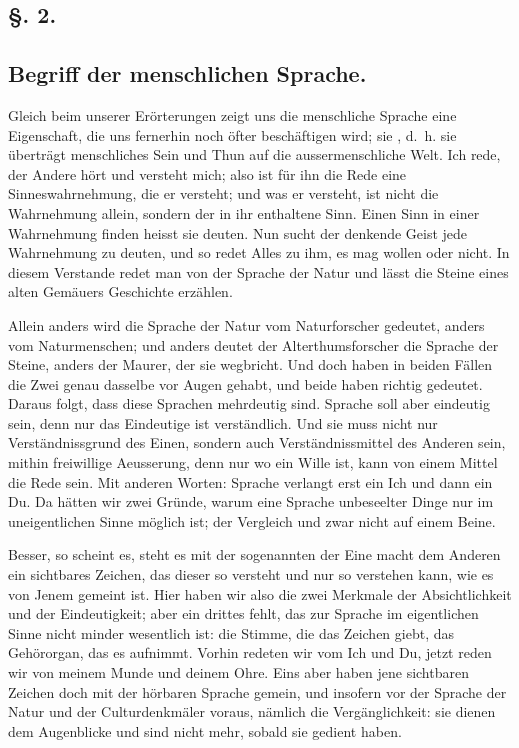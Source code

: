 \label{sp.2}

\subsection*{§. 2.}\label{I.I.2}
\subsection*{Begriff der menschlichen Sprache.}

Gleich beim  unserer Erörterungen zeigt uns die menschliche Sprache eine Eigenschaft, die uns fernerhin noch öfter beschäftigen wird; sie , d.~h. sie überträgt menschliches Sein und Thun auf die aussermenschliche Welt. Ich rede, der Andere hört und versteht mich; also ist für ihn die Rede eine Sinneswahrnehmung, die er versteht; und was er versteht, ist nicht die Wahrnehmung allein, sondern der in ihr enthaltene Sinn. Einen Sinn in einer Wahrnehmung finden heisst sie deuten. Nun sucht der denkende Geist jede Wahrnehmung zu deuten, und so redet Alles zu ihm, es mag wollen oder nicht. In diesem Verstande redet man von der Sprache der Natur und lässt die Steine eines alten Gemäuers Geschichte erzählen.

Allein anders wird die Sprache der Natur vom Naturforscher gedeutet, anders vom Naturmenschen; und anders deutet der Alterthumsforscher die Sprache der Steine, anders der Maurer, der sie wegbricht. Und doch haben in beiden Fällen die Zwei genau dasselbe vor Augen gehabt, und beide haben richtig gedeutet. Daraus folgt, dass diese Sprachen mehrdeutig sind. Sprache soll aber eindeutig sein, denn nur das Eindeutige ist verständlich. Und sie muss nicht nur Verständnissgrund des Einen, sondern auch Verständnissmittel des Anderen sein, mithin freiwillige Aeusserung, denn nur wo ein Wille ist, kann von einem Mittel die Rede sein. Mit anderen Worten: Sprache verlangt erst ein Ich und dann ein Du. Da hätten wir zwei Gründe, warum eine Sprache unbeseelter Dinge nur im uneigentlichen Sinne möglich ist; der Vergleich  und zwar nicht  auf einem Beine.

Besser, so scheint es, steht es mit der sogenannten  der Eine macht dem Anderen ein sichtbares Zeichen, das dieser so versteht und nur so verstehen kann, wie es von Jenem gemeint ist. Hier haben wir also die zwei Merkmale der Absichtlichkeit und der Eindeutigkeit; aber ein drittes fehlt, das zur Sprache im eigentlichen Sinne nicht minder wesentlich ist: die Stimme, die das Zeichen giebt, das Gehörorgan, das es aufnimmt. Vorhin redeten wir vom Ich und \label{fp.3} Du, jetzt reden wir von meinem Munde und deinem Ohre. Eins aber haben jene sichtbaren Zeichen doch mit der hörbaren Sprache gemein, und insofern vor der Sprache der Natur und der Culturdenkmäler voraus, nämlich die Vergänglichkeit: sie dienen dem Augenblicke und sind nicht mehr, sobald sie gedient haben.

